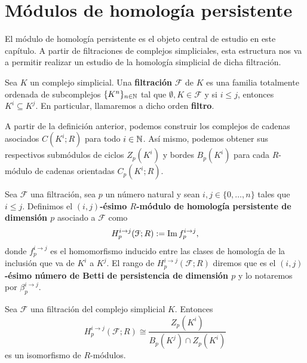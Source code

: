 \section{Módulos de homología persistente}

El módulo de homología persistente es el objeto central de estudio en este
capítulo. A partir de filtraciones de complejos simpliciales, esta estructura
nos va a permitir realizar un estudio de la homología simplicial de dicha
filtración.

\begin{definicion}
	Sea $K$ un complejo simplicial. Una \textbf{filtración} $\mathcal{F}$ de $K$ es
	una familia totalmente ordenada de subcomplejos $\{K^{n}\}_{n \in \mathbb{N}}$ tal que
	$\emptyset, K \in \mathcal{F}$ y si $i \leq j$, entonces
	$K^{i} \subseteq K^{j}$. En particular, llamaremos a dicho orden \textbf{filtro}.
\end{definicion}
A partir de la definición anterior, podemos construir los complejos de cadenas asociados
$C(K^{i};R)$ para todo $i \in \mathbb{N}$. Así mismo, podemos obtener sus respectivos submódulos
de ciclos $Z_{p}(K^{i})$ y bordes $B_{p}(K^{i})$ para cada $R$-módulo de cadenas
orientadas $C_{p}(K^{i};R)$.
\begin{definicion}
	Sea $\mathcal{F}$ una filtración, sea $p$ un número natural y sean
	$i,j \in \{0, \dots, n\}$ tales que $i \leq j$. Definimos el \textbf{$(i,j)$-ésimo
		$R$-módulo de homología persistente de dimensión $p$} asociado a $\mathcal{F}$
	como
	\[
	H_{p}^{i \to j}(\mathcal{F};R) := \operatorname{Im} f_{p}^{i \to j},
	\]
	donde $f_{p}^{i \to j}$ es el homomorfismo inducido entre las clases de
	homología de la inclusión que va de $K^{i}$ a $K^{j}$. El rango de $H_{p}^{i
		\to j}(\mathcal{F};R)$ diremos que es el \textbf{$(i,j)$-ésimo número de Betti
		de persistencia de dimensión $p$} y lo notaremos por $\beta_{p}^{i \to j}$.
\end{definicion}
\begin{proposicion}
	Sea $\mathcal{F}$ una filtración del complejo simplicial $K$. Entonces
	\[
	H_{p}^{i \to j}(\mathcal{F};R) \cong \frac{Z_{p}(K^{i})}{B_{p}(K^{j}) \cap Z_{p}(K^{i})}
	\]
	es un isomorfismo de $R$-módulos.
\end{proposicion}
